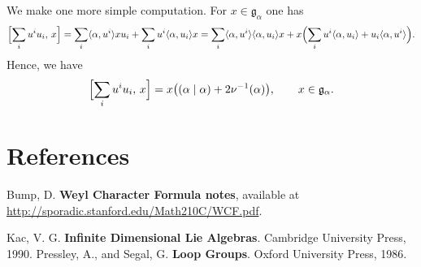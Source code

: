 \documentclass[12pt]{article}
\begin{document}
\medskip
We make one more simple computation. 
For $x\in \mathfrak{g}_\alpha$ one has
\[
\Bigl[\sum_i u^i u_i,\, x\Bigr] 
= \sum_i \langle \alpha,u^i\rangle x u_i + \sum_i u^i \langle \alpha,u_i\rangle x
= \sum_i \langle \alpha,u^i\rangle \langle \alpha,u_i\rangle x 
+ x\Bigl(\sum_i u^i \langle \alpha,u_i\rangle + u_i \langle \alpha,u^i\rangle\Bigr).
\]
Hence, we have
\[
\Bigl[\sum_i u^i u_i,\, x\Bigr] = x\bigl((\alpha\mid \alpha) + 2\nu^{-1}(\alpha)\bigr),
\qquad x\in \mathfrak{g}_\alpha.
\]


\section{References}
\begin{enumerate}
     Bump, D. \textbf{Weyl Character Formula notes}, available at \url{http://sporadic.stanford.edu/Math210C/WCF.pdf}.

     Kac, V. G. \textbf{Infinite Dimensional Lie Algebras}. Cambridge University Press, 1990.
     Pressley, A., and Segal, G. \textbf{Loop Groups}. Oxford University Press, 1986.
\end{enumerate}
\end{document}
